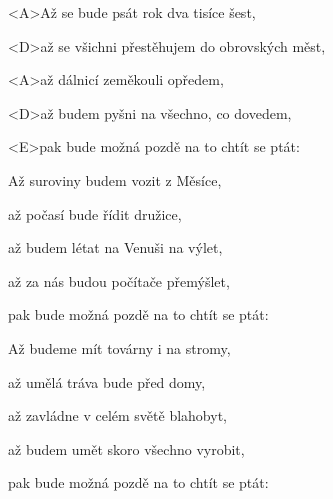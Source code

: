 

\zs
<A>Až se bude psát rok dva tisíce šest,

<D>až se všichni přestěhujem do obrovských měst,

<A>až dálnicí zeměkouli opředem,

<D>až budem pyšni na všechno, co dovedem,

<E>pak bude možná pozdě na to chtít se ptát:

\ks

\zs
Až suroviny budem vozit z Měsíce,

až počasí bude řídit družice,

až budem létat na Venuši na výlet,

až za nás budou počítače přemýšlet,

pak bude možná pozdě na to chtít se ptát:

\ks

\zs
Až budeme mít továrny i na stromy,

až umělá tráva bude před domy,

až zavládne v celém světě blahobyt,

až budem umět skoro všechno vyrobit,

pak bude možná pozdě na to chtít se ptát:

\ks

\kp
